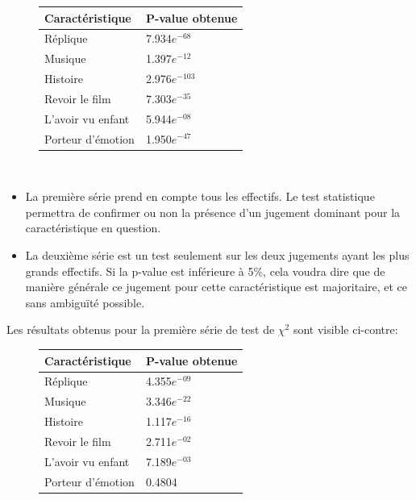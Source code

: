 \documentclass{article} %
\begin{document}
\begin{figure}
\begin{tabular}{|p{3cm}|p{2cm}|}
	\hline
	\rule{0cm}{5mm}
	Caractéristique & P-value obtenue \\
	\hline
	\rule{0cm}{5mm}
	Réplique & 7.934$e^{-68}$\\
	\hline
	\rule{0cm}{5mm}
	Musique & 1.397$e^{-12}$\\
	\hline
	\rule{0cm}{5mm}
	Histoire & 2.976$e^{-103}$\\
	\hline
	\rule{0cm}{5mm}
	Revoir le film & 7.303$e^{-35}$\\
	\hline
	\rule{0cm}{5mm}
	L’avoir vu enfant & 5.944$e^{-08}$\\
	\hline
	\rule{0cm}{5mm}
	Porteur d’émotion & 1.950$e^{-47}$ \\
	\hline
\end{tabular}
\end{figure}
~\\
\begin{itemize}
	\item La première série prend en compte tous les effectifs. Le test statistique permettra de confirmer ou non la présence d’un jugement dominant pour la caractéristique en question.
	\item La deuxième série est un test seulement sur les deux jugements ayant les plus grands effectifs. Si la p-value est inférieure à 5\%, cela voudra dire que de manière générale ce jugement pour cette caractéristique est majoritaire, et ce sans ambiguïté possible.
\end{itemize}
Les résultats obtenus pour la première série de test de $\chi^2$ sont visible ci-contre:
\begin{figure}
	\begin{tabular}{|p{3cm}|p{2cm}|}
		\hline
		\rule{0cm}{5mm}
		Caractéristique & P-value obtenue \\
		\hline
		\rule{0cm}{5mm}
		Réplique & 4.355$e^{-09}$\\
		\hline
		\rule{0cm}{5mm}
		Musique & 3.346$e^{-22}$\\
		\hline
		\rule{0cm}{5mm}
		Histoire & 1.117$e^{-16}$\\
		\hline
		\rule{0cm}{5mm}
		Revoir le film & 2.711$e^{-02}$\\
		\hline
		\rule{0cm}{5mm}
		L’avoir vu enfant & 7.189$e^{-03}$\\
		\hline
		\rule{0cm}{5mm}
		Porteur d’émotion & 0.4804 \\
		\hline
	\end{tabular}
\end{figure}
\end{document}
